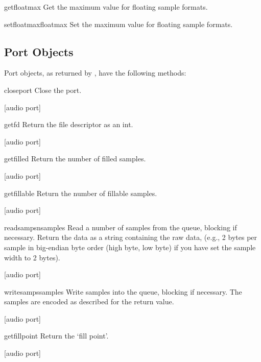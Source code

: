 \begin{methoddesc}{getfloatmax}{}
Get the maximum value for floating sample formats.
\end{methoddesc}

\begin{methoddesc}{setfloatmax}{floatmax}
Set the maximum value for floating sample formats.
\end{methoddesc}


\subsection{Port Objects}
\label{al-port-objects}

Port objects, as returned by , have the following
methods:

\begin{methoddesc}{closeport}{}
Close the port.
\end{methoddesc}[audio port]

\begin{methoddesc}{getfd}{}
Return the file descriptor as an int.
\end{methoddesc}[audio port]

\begin{methoddesc}{getfilled}{}
Return the number of filled samples.
\end{methoddesc}[audio port]

\begin{methoddesc}{getfillable}{}
Return the number of fillable samples.
\end{methoddesc}[audio port]

\begin{methoddesc}{readsamps}{nsamples}
Read a number of samples from the queue, blocking if necessary.
Return the data as a string containing the raw data, (e.g., 2 bytes per
sample in big-endian byte order (high byte, low byte) if you have set
the sample width to 2 bytes).
\end{methoddesc}[audio port]

\begin{methoddesc}{writesamps}{samples}
Write samples into the queue, blocking if necessary.  The samples are
encoded as described for the  return value.
\end{methoddesc}[audio port]

\begin{methoddesc}{getfillpoint}{}
Return the `fill point'.
\end{methoddesc}[audio port]

